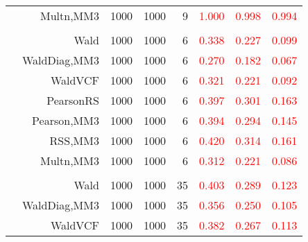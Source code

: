 \documentclass[
]{article}
\begin{document}
\begin{table}[H]
{\begin{tabular}[t]{lrrrrrrr}
\hspace{1em} & Multn,MM3 & 1000 & 1000 & 9 & \textcolor{red}{1.000} & \textcolor{red}{0.998} & \textcolor{red}{0.994}\\
\cmidrule{1-8}
\addlinespace[0.3em]
\multicolumn{8}{l}{\textbf{2F 10V}}\\
\hspace{1em} & Wald & 1000 & 1000 & 6 & \textcolor{red}{0.338} & \textcolor{red}{0.227} & \textcolor{red}{0.099}\\

\hspace{1em} & WaldDiag,MM3 & 1000 & 1000 & 6 & \textcolor{red}{0.270} & \textcolor{red}{0.182} & \textcolor{red}{0.067}\\

\hspace{1em} & WaldVCF & 1000 & 1000 & 6 & \textcolor{red}{0.321} & \textcolor{red}{0.221} & \textcolor{red}{0.092}\\

\hspace{1em} & PearsonRS & 1000 & 1000 & 6 & \textcolor{red}{0.397} & \textcolor{red}{0.301} & \textcolor{red}{0.163}\\

\hspace{1em} & Pearson,MM3 & 1000 & 1000 & 6 & \textcolor{red}{0.394} & \textcolor{red}{0.294} & \textcolor{red}{0.145}\\

\hspace{1em} & RSS,MM3 & 1000 & 1000 & 6 & \textcolor{red}{0.420} & \textcolor{red}{0.314} & \textcolor{red}{0.161}\\

\hspace{1em} & Multn,MM3 & 1000 & 1000 & 6 & \textcolor{red}{0.312} & \textcolor{red}{0.221} & \textcolor{red}{0.086}\\
\cmidrule{1-8}
\addlinespace[0.3em]
\multicolumn{8}{l}{\textbf{3F 15V}}\\
\hspace{1em} & Wald & 1000 & 1000 & 35 & \textcolor{red}{0.403} & \textcolor{red}{0.289} & \textcolor{red}{0.123}\\

\hspace{1em} & WaldDiag,MM3 & 1000 & 1000 & 35 & \textcolor{red}{0.356} & \textcolor{red}{0.250} & \textcolor{red}{0.105}\\

\hspace{1em} & WaldVCF & 1000 & 1000 & 35 & \textcolor{red}{0.382} & \textcolor{red}{0.267} & \textcolor{red}{0.113}\\


\end{tabular}}
\end{table}
\end{document}
